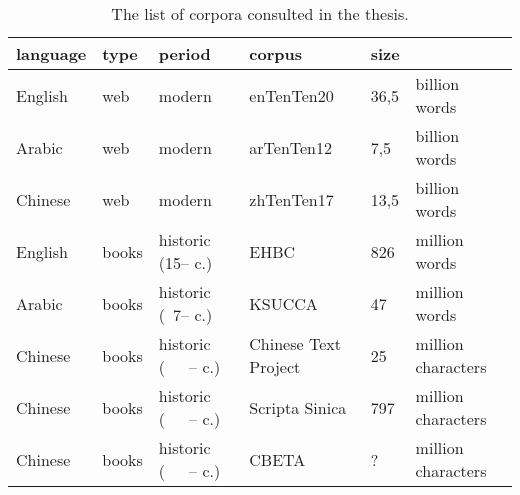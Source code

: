 \begin{table}[ht]
    \caption[The list of corpora consulted in the thesis.]{The list of corpora consulted in the thesis.}
    \begin{tabularx}{\textwidth}{@{}lllLl@{}l@{}}
    \toprule
    \textbf{language} & \textbf{type} & \textbf{period} &  \textbf{corpus} & \textbf{size} & \\ \midrule
    English           & web      & modern                       & enTenTen20 & 36,5 & billion words    \\
    Arabic            & web      & modern                       & arTenTen12 & 7,5 & billion words    \\
    Chinese           & web      & modern                       & zhTenTen17 & 13,5 & billion words    \\ \midrule
    English           & books    & historic (15-- c.)   & EHBC      & 826   & million words    \\
    Arabic            & books    & historic (~7-- c.)    & KSUCCA    & 47    & million words    \\
    Chinese           & books    & historic (~~~-- c.)     & Chinese Text Project    & 25    & million characters \\ 
    Chinese           & books    & historic (~~~-- c.)     & Scripta Sinica        & 797   & million characters \\ 
    Chinese           & books    & historic (~~~-- c.)     & CBETA        & ?   & million characters \\ 
    \bottomrule
    \end{tabularx}
    \label{table:corpora}
\end{table}


